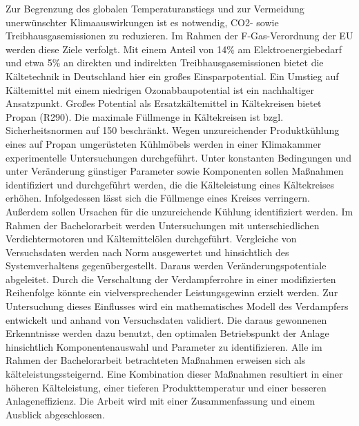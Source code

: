 Zur Begrenzung des globalen Temperaturanstiegs und zur Vermeidung unerwünschter Klimaauswirkungen ist es notwendig, CO2- sowie Treibhausgasemissionen zu reduzieren. Im Rahmen der F-Gas-Verordnung der EU werden diese Ziele verfolgt. Mit einem Anteil von \unit{14}{\%} am Elektroenergiebedarf und etwa \unit{5}{\%} an direkten und indirekten Treibhausgasemissionen bietet die Kältetechnik in Deutschland hier ein großes Einsparpotential. Ein Umstieg auf Kältemittel mit einem niedrigen Ozonabbaupotential ist ein nachhaltiger Ansatzpunkt. \newline
Großes Potential als Ersatzkältemittel in Kältekreisen bietet Propan (R290). Die maximale Füllmenge in Kältekreisen ist bzgl. Sicherheitsnormen auf \unit{150}{\gram} beschränkt. 
Wegen unzureichender Produktkühlung eines auf Propan umgerüsteten Kühlmöbels werden in einer Klimakammer experimentelle Untersuchungen durchgeführt. Unter konstanten Bedingungen und unter Veränderung günstiger Parameter sowie Komponenten sollen Maßnahmen identifiziert und durchgeführt werden, die die Kälteleistung eines Kältekreises erhöhen. Infolgedessen lässt sich die Füllmenge eines Kreises verringern. Außerdem sollen Ursachen für die unzureichende Kühlung identifiziert werden. \newline
Im Rahmen der Bachelorarbeit werden Untersuchungen mit unterschiedlichen Verdichtermotoren und Kältemittelölen durchgeführt. Vergleiche von Versuchsdaten werden nach Norm ausgewertet und hinsichtlich des Systemverhaltens gegenübergestellt. Daraus werden Veränderungspotentiale abgeleitet.
Durch die Verschaltung der Verdampferrohre in einer modifizierten Reihenfolge könnte ein vielversprechender Leistungsgewinn erzielt werden. Zur Untersuchung dieses Einflusses wird ein mathematisches Modell des Verdampfers entwickelt und anhand von Versuchsdaten validiert.
Die daraus gewonnenen Erkenntnisse werden dazu benutzt, den optimalen Betriebspunkt der Anlage hinsichtlich Komponentenauswahl und Parameter zu identifizieren. \newline
Alle im Rahmen der Bachelorarbeit betrachteten Maßnahmen erweisen sich als kälteleistungssteigernd. Eine Kombination dieser Maßnahmen resultiert in einer höheren Kälteleistung, einer tieferen Produkttemperatur und einer besseren Anlageneffizienz.
Die Arbeit wird mit einer Zusammenfassung und einem Ausblick abgeschlossen.
